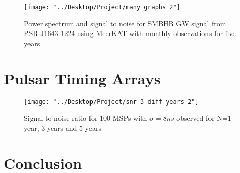 \documentclass[12pt]{article}
\begin{document}
\begin{figure}[h!]
	\texttt{[image: "../Desktop/Project/many graphs 2"]}
	\caption{Power spectrum and signal to noise for SMBHB GW signal from PSR J1643-1224 using MeerKAT with monthly observations for five years}
	\label{fig:many-graphs-2}
\end{figure}

	
	\section{Pulsar Timing Arrays}
	\begin{figure}[h!]
		\texttt{[image: "../Desktop/Project/snr 3 diff years 2"]}
		\caption{Signal to noise ratio for 100 MSPs with $\sigma=8ns$ observed for N=1 year, 3 years and 5 years}
		\label{fig:snr-3-diff-years-2}
	\end{figure}
	
	\section{Conclusion}
	
\end{document}

